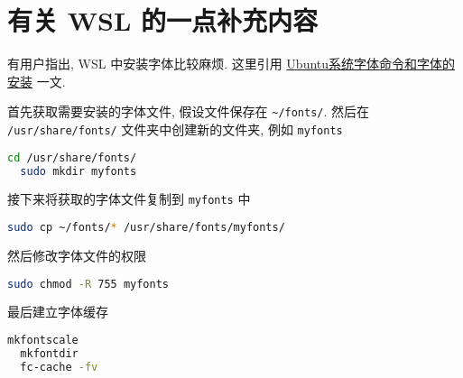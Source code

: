 
\chapter{有关 WSL 的一点补充内容}

有用户指出,
WSL 中安装字体比较麻烦.
这里引用 \href{https://www.jianshu.com/p/e7f12b8c8602}{Ubuntu系统字体命令和字体的安装} 一文.

首先获取需要安装的字体文件,
假设文件保存在 \verb|~/fonts/|.
然后在 \texttt{/usr/share/fonts/} 文件夹中创建新的文件夹,
例如 \texttt{myfonts}
\begin{lstlisting}[language=bash]
  cd /usr/share/fonts/
  sudo mkdir myfonts
\end{lstlisting}
接下来将获取的字体文件复制到 \texttt{myfonts} 中
\begin{lstlisting}[language=bash]
  sudo cp ~/fonts/* /usr/share/fonts/myfonts/ 
\end{lstlisting}
然后修改字体文件的权限
\begin{lstlisting}[language=bash]
  sudo chmod -R 755 myfonts
\end{lstlisting}
最后建立字体缓存
\begin{lstlisting}[language=bash]
  mkfontscale
  mkfontdir
  fc-cache -fv
\end{lstlisting}

